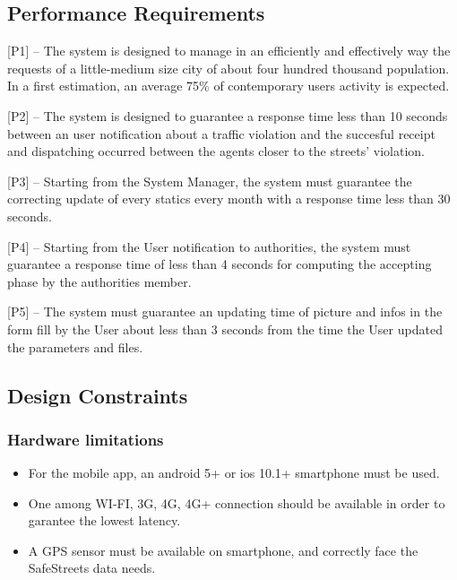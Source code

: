\documentclass[12pt]{article}
\begin{document}
\subsection{ Performance Requirements}
\vspace{4mm}
\begin{flushleft}

[P1] – The system is designed to manage in an efficiently and effectively way the requests of a little-medium size city of about four hundred thousand population. In a first estimation, an average 75\% of contemporary users activity is expected.
\vspace{2mm}

[P2] – The system is designed to guarantee a response time less than 10 seconds between an user notification about a traffic violation and the succesful receipt and dispatching occurred between the agents closer to the streets’ violation.
\vspace{2mm}

[P3] – Starting from the System Manager, the system must guarantee the correcting update of every statics every month with a response time less than 30 seconds.
\vspace{2mm}

[P4] – Starting from the User notification to authorities, the system must guarantee a response time of less than 4 seconds for computing the accepting phase by the authorities member.

\vspace{2mm}
[P5] – The system must guarantee an updating time of picture and infos in the form fill by the User about less than 3 seconds from the time the User updated the parameters and files.
\end{flushleft}


\subsection{Design Constraints}

\subsubsection{Hardware limitations}
\vspace{3mm}\begin{itemize}
\item For the mobile app, an android 5+ or ios 10.1+ smartphone must be used.

\item One among WI-FI, 3G, 4G, 4G+ connection should be available in order to garantee the lowest latency.

\item A GPS sensor must be available on smartphone, and correctly face the SafeStreets data needs.

\end{itemize}
\end{document}
